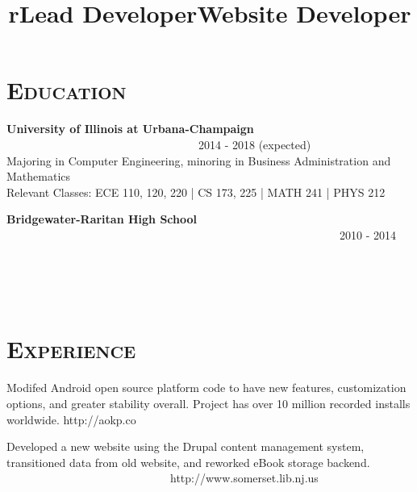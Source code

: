 \begin{resume}
\section{\textsc{Education}}
\textbf{University of Illinois at Urbana-Champaign} \ \ \ \ \ \ \ \ \ \ \ \ \ \ \ \ \ \ \ \ \ \ \ \ \ \ \ \ \ \ \ \ \ \ 2014 - 2018 (expected) \\
Majoring in Computer Engineering, minoring in Business Administration and Mathematics \\
Relevant Classes: ECE 110, 120, 220 | CS 173, 225 | MATH 241 | PHYS 212

\textbf{Bridgewater-Raritan High School} \ \ \ \ \ \ \ \ \ \ \ \ \ \ \ \ \ \ \ \ \ \ \ \ \ \ \ \ \ \ \ \ \ \ \ \ \ \ \ \ \ \ \ \ \ \ \ \ \ \ \ \ \ \ \ \ \ \ \ 2010 - 2014

\begin{formatb}
  \title{r}\\
  \\
  \body\\
\end{formatb}

\section{\textsc{Experience}}

\title{Lead Developer}
\begin{position}
Modifed Android open source platform code to have new features, customization options, and greater stability overall. Project has over 10 million recorded installs worldwide. http://aokp.co
\end{position}

\title{Website Developer}
\begin{position}
Developed a new website using the Drupal content management system, transitioned data from old website, and reworked eBook storage backend. \ \ \ \ \ \ \ \ \ \ \ \ \ \ \ \ \ \ \ \ \ \ \ \ \ \ \ \ \ http://www.somerset.lib.nj.us
\end{position}

\begin{formatb}
  \\
  \body\\
\end{formatb}


\end{resume}
